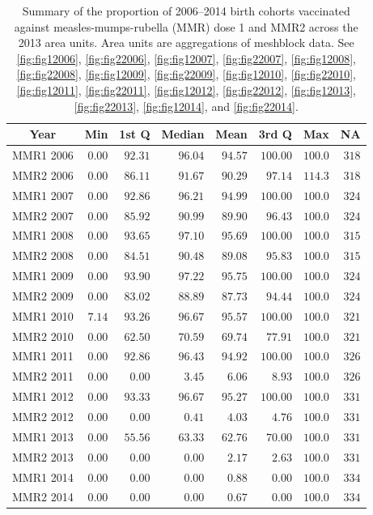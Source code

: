 \documentclass{article}
\begin{document}
 \vspace{5mm} %
\begin{table}
\begin{center}
\begin{tabular}{lrrrrrrr}
\hline\hline
\multicolumn{1}{c}{Year}&\multicolumn{1}{c}{Min}&\multicolumn{1}{c}{1st Q}&\multicolumn{1}{c}{Median}&\multicolumn{1}{c}{Mean}&\multicolumn{1}{c}{3rd Q}&\multicolumn{1}{c}{Max}&\multicolumn{1}{c}{NA}\tabularnewline
\hline
MMR1 2006&$0.00$&$92.31$&$96.04$&$94.57$&$100.00$&$100.0$&$318$\tabularnewline
MMR2 2006&$0.00$&$86.11$&$91.67$&$90.29$&$ 97.14$&$114.3$&$318$\tabularnewline
MMR1 2007&$0.00$&$92.86$&$96.21$&$94.99$&$100.00$&$100.0$&$324$\tabularnewline
MMR2 2007&$0.00$&$85.92$&$90.99$&$89.90$&$ 96.43$&$100.0$&$324$\tabularnewline
MMR1 2008&$0.00$&$93.65$&$97.10$&$95.69$&$100.00$&$100.0$&$315$\tabularnewline
MMR2 2008&$0.00$&$84.51$&$90.48$&$89.08$&$ 95.83$&$100.0$&$315$\tabularnewline
MMR1 2009&$0.00$&$93.90$&$97.22$&$95.75$&$100.00$&$100.0$&$324$\tabularnewline
MMR2 2009&$0.00$&$83.02$&$88.89$&$87.73$&$ 94.44$&$100.0$&$324$\tabularnewline
MMR1 2010&$7.14$&$93.26$&$96.67$&$95.57$&$100.00$&$100.0$&$321$\tabularnewline
MMR2 2010&$0.00$&$62.50$&$70.59$&$69.74$&$ 77.91$&$100.0$&$321$\tabularnewline
MMR1 2011&$0.00$&$92.86$&$96.43$&$94.92$&$100.00$&$100.0$&$326$\tabularnewline
MMR2 2011&$0.00$&$ 0.00$&$ 3.45$&$ 6.06$&$  8.93$&$100.0$&$326$\tabularnewline
MMR1 2012&$0.00$&$93.33$&$96.67$&$95.27$&$100.00$&$100.0$&$331$\tabularnewline
MMR2 2012&$0.00$&$ 0.00$&$ 0.41$&$ 4.03$&$  4.76$&$100.0$&$331$\tabularnewline
MMR1 2013&$0.00$&$55.56$&$63.33$&$62.76$&$ 70.00$&$100.0$&$331$\tabularnewline
MMR2 2013&$0.00$&$ 0.00$&$ 0.00$&$ 2.17$&$  2.63$&$100.0$&$331$\tabularnewline
MMR1 2014&$0.00$&$ 0.00$&$ 0.00$&$ 0.88$&$  0.00$&$100.0$&$334$\tabularnewline
MMR2 2014&$0.00$&$ 0.00$&$ 0.00$&$ 0.67$&$  0.00$&$100.0$&$334$\tabularnewline
\hline
\end{tabular}\end{center}\caption{Summary of the proportion of 2006--2014 birth cohorts vaccinated against measles-mumps-rubella (MMR) dose 1 and MMR2 across the 2013 area units. Area units are aggregations of meshblock data. See \autoref{fig:fig12006}, \autoref{fig:fig22006}, \autoref{fig:fig12007}, \autoref{fig:fig22007}, \autoref{fig:fig12008}, \autoref{fig:fig22008}, \autoref{fig:fig12009}, \autoref{fig:fig22009}, \autoref{fig:fig12010}, \autoref{fig:fig22010}, \autoref{fig:fig12011}, \autoref{fig:fig22011}, \autoref{fig:fig12012}, \autoref{fig:fig22012}, \autoref{fig:fig12013}, \autoref{fig:fig22013}, \autoref{fig:fig12014}, and \autoref{fig:fig22014}.}
\label{table:tab_mmr_nir}
\end{table}
\end{document}
